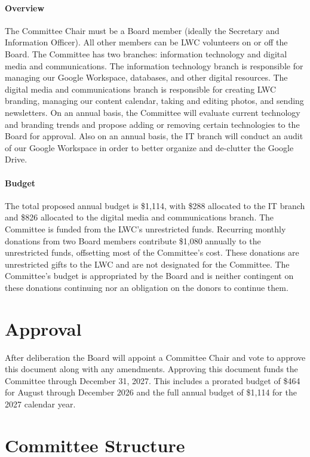 \documentclass[letterpaper,11pt,leqno]{article}
\begin{document}
\paragraph{Overview} The Committee Chair must be a Board member (ideally the Secretary and Information Officer). All other members can be LWC volunteers on or off the Board. The Committee has two branches: information technology and digital media and communications.
The information technology branch is responsible for managing our Google Workspace, databases, and other digital resources. The digital media and communications branch is responsible for creating LWC branding, managing our content calendar, taking and editing photos, and sending newsletters.
On an annual basis, the Committee will evaluate current technology and branding trends and propose adding or removing certain technologies to the Board for approval. Also on an annual basis, the IT branch will conduct an audit of our Google Workspace in order to better organize and de-clutter the Google Drive.

\paragraph{Budget} The total proposed annual budget is \$1,114, with \$288 allocated to the IT branch and \$826 allocated to the digital media and communications branch. The Committee is funded from the LWC's unrestricted funds.
Recurring monthly donations from two Board members contribute \$1,080 annually to the unrestricted funds, offsetting most of the Committee's cost. These donations are unrestricted gifts to the LWC and are not designated for the Committee. The Committee's budget is appropriated by the Board and is neither contingent on these donations continuing nor an obligation on the donors to continue them.

\section{Approval}\label{s:approval}
After deliberation the Board will appoint a Committee Chair and vote to approve this document along with any amendments. Approving this document funds the Committee through December 31, 2027.
This includes a prorated budget of \$464 for August through December 2026 and the full annual budget of \$1,114 for the 2027 calendar year.

\section{Committee Structure}\label{s:structure}
\end{document}
